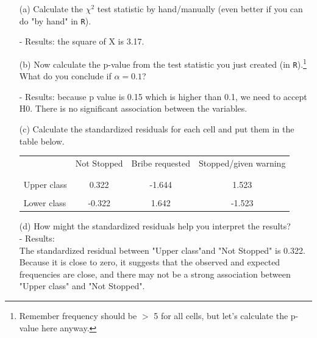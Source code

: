 \documentclass[12pt,letterpaper]{article}
\begin{document}
\begin{enumerate}
	
	\item [(a)]
	Calculate the $\chi^2$ test statistic by hand/manually (even better if you can do "by hand" in \texttt{R}).\\
	\vspace{1cm}
	
	\noindent
	- Results: the square of X is 3.17.
	\item [(b)]
	Now calculate the p-value from the test statistic you just created (in \texttt{R}).\footnote{Remember frequency should be $>$ 5 for all cells, but let's calculate the p-value here anyway.}  What do you conclude if $\alpha = 0.1$?\\
	\vspace{1cm}
	
	\noindent
	- Results: because p value is 0.15 which is  higher than 0.1, we need to accept H0. There is no significant association between the variables.
	\item [(c)] Calculate the standardized residuals for each cell and put them in the table below.
	\begin{table}[h]
		\centering
		\begin{tabular}{l | c c c }
			& Not Stopped & Bribe requested & Stopped/given warning \\
			\\[-1.8ex] 
			\hline \\[-1.8ex]
			Upper class  & 0.322 & -1.644 & 1.523 \\
			\\
			Lower class & -0.322 & 1.642  & -1.523  \\
			
		\end{tabular}
	\end{table}
	\vspace{1cm}
      		
	
	\vspace{1cm}
	\item [(d)] How might the standardized residuals help you interpret the results?\\  
	\noindent
	- Results:\\
	The standardized residual between "Upper class"and "Not Stopped" is 0.322.  Because it is close to zero, it suggests that the observed and expected frequencies are close, and there may not be a strong association between  "Upper class" and "Not Stopped".\\
	

\end{enumerate}
\end{document}
